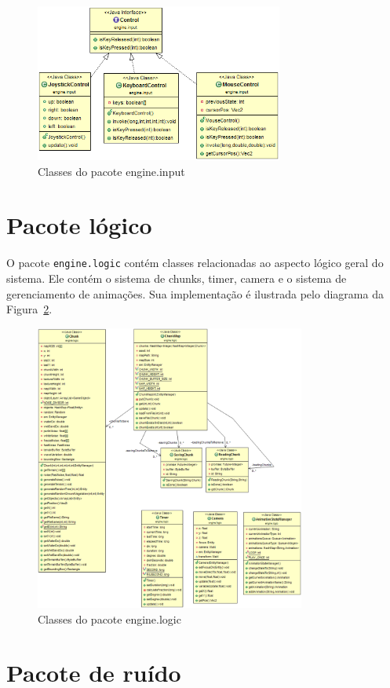 \documentclass[12pt, 
openright, 
oneside, 
a4paper,    
brazil]{facom-ufu-abntex2}
\begin{document}
\begin{figure}[H]
	\centering
	\includegraphics[width=22em]{imagens/engine.input.png}
	\caption{Classes do pacote engine.input}
	\label{fig:engine.input}
\end{figure}


\section{Pacote lógico}

O pacote \texttt{engine.logic} contém classes relacionadas ao aspecto lógico geral do sistema. Ele contém o sistema de chunks, timer, camera e o sistema de gerenciamento de animações. Sua implementação é ilustrada pelo diagrama da Figura~\ref{fig:engine.logic}.

\begin{figure}[H]
	\centering
	\includegraphics[width=24em]{imagens/engine.logic.png}
	\caption{Classes do pacote engine.logic}
	\label{fig:engine.logic}
\end{figure}

\section{Pacote de ruído}
\end{document}

